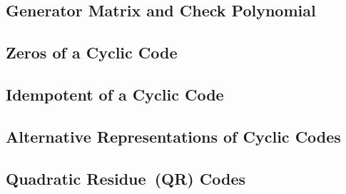 \documentclass{article}
\renewcommand{\=}{\equiv}
\theoremstyle{plain}
\theoremstyle{definition}
\begin{document}
\subsection{Generator Matrix and Check Polynomial}

\subsection{Zeros of a Cyclic Code}

\subsection{Idempotent of a Cyclic Code}

\subsection{Alternative Representations of Cyclic Codes}

\subsection{Quadratic Residue (QR) Codes}
\end{document}
